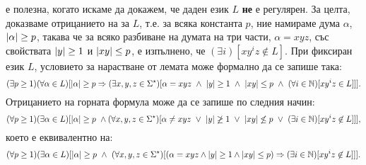 \begin{framed}
   е полезна, когато искаме да докажем, че даден език $L$ {\bf не} е регулярен.
  За целта, доказваме отрицанието на  за $L$, т.е.
  за всяка константа $p$, ние намираме дума $\alpha$, $\lvert{\alpha}\rvert\geq p$, такава че за всяко разбиване на думата на три части, $\alpha = xyz$,
  със свойствата $\lvert{y}\rvert \geq 1$ и $\lvert{xy}\rvert \leq p$, е изпълнено, че $(\exists i)[xy^iz \not\in L]$.
  При фиксиран език $L$, условието за нарастване от лемата може формално да се запише така:
  {\scriptsize  
    \[(\exists p \geq 1)(\forall \alpha \in L)[\abs{\alpha} \geq p \Rightarrow (\exists x,y,z\in\Sigma^\star)[\alpha = xyz\ \wedge\ \abs{y} \geq 1\ \wedge\ \abs{xy} \leq p\ \wedge\ (\forall i\in\Nat)[xy^iz \in L]]].\]}
  Отрицанието на горната формула може да се запише по следния начин:
  {\scriptsize  \[(\forall p \geq 1)(\exists \alpha \in L)[\abs{\alpha} \geq p\ \wedge (\forall x,y,z\in\Sigma^\star)[\alpha \neq xyz\ \vee\ \abs{y} \not\geq 1\ \vee\ \abs{xy} \not\leq p\ \vee\ (\exists i\in\Nat)[xy^iz \not\in L]]],\]}
  което е еквивалентно на:
  {\scriptsize
    \[(\forall p \geq 1)(\exists \alpha \in L)[\lvert{\alpha}\rvert \geq p\ \wedge\ (\forall x,y,z\in\Sigma^\star)[(\alpha = xyz \wedge \lvert{y}\rvert \geq 1\wedge \lvert{xy}\rvert \leq p) \Rightarrow (\exists i\in\mathbb{N})[xy^iz \not\in L]]].\]}
\end{framed}

